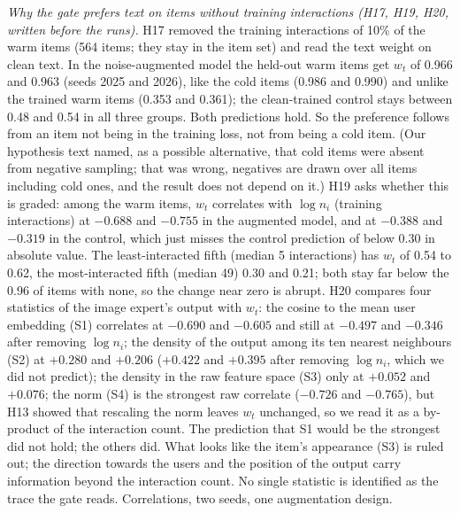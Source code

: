 \documentclass[conference]{IEEEtran}
\begin{document}
\emph{Why the gate prefers text on items without training interactions (H17, H19, H20, written before the runs).} H17 removed the training interactions of 10\% of the warm items (564 items; they stay in the item set) and read the text weight on clean text. In the noise-augmented model the held-out warm items get $w_t$ of 0.966 and 0.963 (seeds 2025 and 2026), like the cold items (0.986 and 0.990) and unlike the trained warm items (0.353 and 0.361); the clean-trained control stays between 0.48 and 0.54 in all three groups. Both predictions hold. So the preference follows from an item not being in the training loss, not from being a cold item. (Our hypothesis text named, as a possible alternative, that cold items were absent from negative sampling; that was wrong, negatives are drawn over all items including cold ones, and the result does not depend on it.) H19 asks whether this is graded: among the warm items, $w_t$ correlates with $\log n_i$ (training interactions) at $-0.688$ and $-0.755$ in the augmented model, and at $-0.388$ and $-0.319$ in the control, which just misses the control prediction of below 0.30 in absolute value. The least-interacted fifth (median 5 interactions) has $w_t$ of 0.54 to 0.62, the most-interacted fifth (median 49) 0.30 and 0.21; both stay far below the 0.96 of items with none, so the change near zero is abrupt. H20 compares four statistics of the image expert's output with $w_t$: the cosine to the mean user embedding (S1) correlates at $-0.690$ and $-0.605$ and still at $-0.497$ and $-0.346$ after removing $\log n_i$; the density of the output among its ten nearest neighbours (S2) at $+0.280$ and $+0.206$ ($+0.422$ and $+0.395$ after removing $\log n_i$, which we did not predict); the density in the raw feature space (S3) only at $+0.052$ and $+0.076$; the norm (S4) is the strongest raw correlate ($-0.726$ and $-0.765$), but H13 showed that rescaling the norm leaves $w_t$ unchanged, so we read it as a by-product of the interaction count. The prediction that S1 would be the strongest did not hold; the others did. What looks like the item's appearance (S3) is ruled out; the direction towards the users and the position of the output carry information beyond the interaction count. No single statistic is identified as the trace the gate reads. Correlations, two seeds, one augmentation design.
\end{document}
